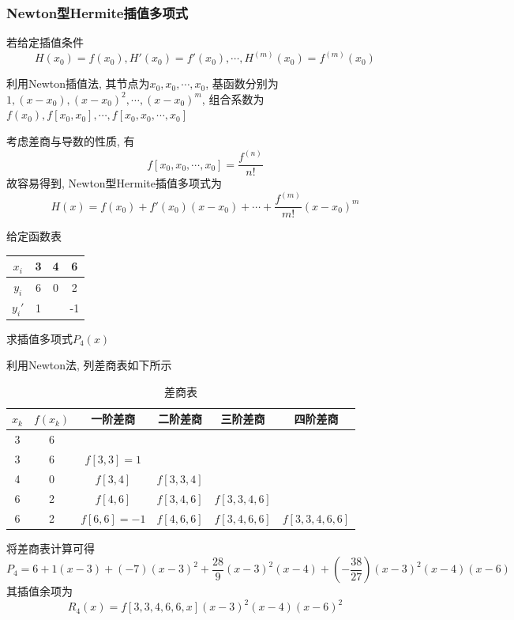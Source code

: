\subsubsection{Newton型Hermite插值多项式}

若给定插值条件
\begin{equation*}
    H(x_0)=f(x_0),H'(x_0)=f'(x_0),\cdots,H^{(m)}(x_0)=f^{(m)}(x_0)
\end{equation*}

利用Newton插值法, 其节点为$x_0,x_0,\cdots,x_0$, 基函数分别为$1,(x-x_0),(x-x_0)^2,\cdots,(x-x_0)^m$, 组合系数为$f(x_0),f[x_0,x_0],\cdots,f[x_0,x_0,\cdots,x_0]$

考虑差商与导数的性质, 有
\begin{equation*}
    f[x_0,x_0,\cdots,x_0]=\frac{f^{(n)}}{n!}
\end{equation*}
故容易得到, Newton型Hermite插值多项式为
\begin{equation*}
    H(x)=f(x_0)+f'(x_0)(x-x_0)+\cdots+\frac{f^{(m)}}{m!}(x-x_0)^m
\end{equation*}

\begin{example}
    给定函数表
    \begin{table}[h]
        \centering
        \begin{tabular}{|c|c|c|c|}
            $x_i$&3&4&6\\
            \hline
            $y_i$&6&0&2\\
            \hline
            $y_i'$&1&&-1\\
        \end{tabular}
    \end{table}
    求插值多项式$P_4(x)$
\end{example}

\begin{solution}
    利用Newton法, 列差商表如下所示
    \begin{table}[h]\label{tab:1}
        \centering
        \caption{差商表}
        \begin{tabular}{|c|c|c|c|c|c|}
            $x_k$&$f(x_k)$&一阶差商&二阶差商&三阶差商&四阶差商\\
            \hline
            3&6& & & & \\
            3&6&$f[3,3]=1$& & &\\
            4&0&$f[3,4]$&$f[3,3,4]$& &\\
            6&2&$f[4,6]$&$f[3,4,6]$&$f[3,3,4,6]$&\\
            6&2&$f[6,6]=-1$&$f[4,6,6]$&$f[3,4,6,6]$&$f[3,3,4,6,6]$\\
        \end{tabular}
    \end{table}
    将差商表计算可得
    \begin{equation*}
        P_4=6+1(x-3)+(-7)(x-3)^2+\frac{28}{9}(x-3)^2(x-4)+\left(-\frac{38}{27}\right)(x-3)^2(x-4)(x-6)
    \end{equation*}
    其插值余项为
    \begin{equation*}
        R_4(x)=f[3,3,4,6,6,x](x-3)^2(x-4)(x-6)^2
    \end{equation*}
\end{solution}